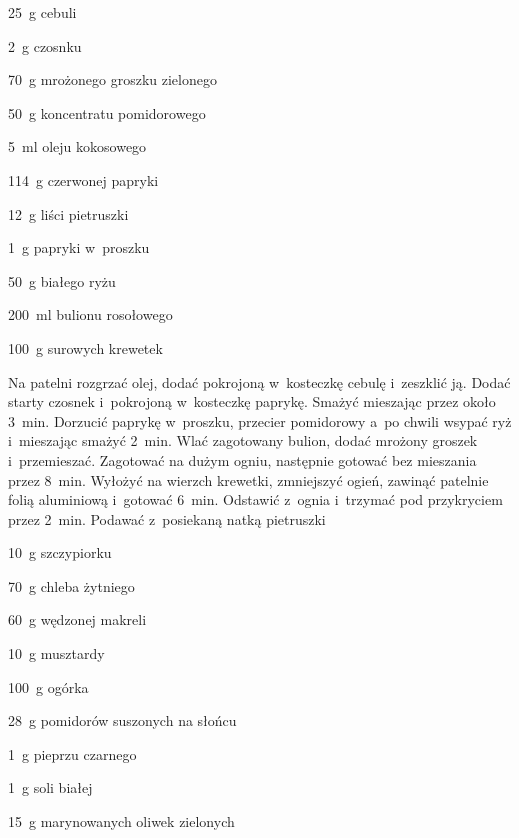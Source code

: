 \documentclass[../kucharek.tex]{subfiles}
\begin{document}
\begin{Ingred}
    \item \qty{25}{\gram} cebuli
    \item \qty{2}{\gram} czosnku
    \item \qty{70}{\gram} mrożonego groszku zielonego
    \item \qty{50}{\gram} koncentratu pomidorowego
    \item \qty{5}{\milli\litre} oleju kokosowego
    \item \qty{114}{\gram} czerwonej papryki
    \item \qty{12}{\gram} liści pietruszki
    \item \qty{1}{\gram} papryki w~proszku
    \item \qty{50}{\gram} białego ryżu
    \item \qty{200}{\milli\litre} bulionu rosołowego
    \item \qty{100}{\gram} surowych krewetek
\end{Ingred}

Na patelni rozgrzać olej, dodać pokrojoną w~kosteczkę cebulę i~zeszklić ją.
Dodać starty czosnek i~pokrojoną w~kosteczkę paprykę. Smażyć mieszając przez
około \qty{3}{\minute}. Dorzucić paprykę w~proszku, przecier pomidorowy a~po
chwili wsypać ryż i~mieszając smażyć \qty{2}{\minute}. Wlać zagotowany bulion,
dodać mrożony groszek i~przemieszać. Zagotować na dużym ogniu, następnie
gotować bez mieszania przez \qty{8}{\minute}. Wyłożyć na wierzch krewetki,
zmniejszyć ogień, zawinąć patelnie folią aluminiową i~gotować \qty{6}{\minute}.
Odstawić z~ognia i~trzymać pod przykryciem przez \qty{2}{\minute}. Podawać
z~posiekaną natką pietruszki


\begin{Ingred}
    \item \qty{10}{\gram} szczypiorku
    \item \qty{70}{\gram} chleba żytniego
    \item \qty{60}{\gram} wędzonej makreli
    \item \qty{10}{\gram} musztardy
    \item \qty{100}{\gram} ogórka
    \item \qty{28}{\gram} pomidorów suszonych na słońcu
    \item \qty{1}{\gram} pieprzu czarnego
    \item \qty{1}{\gram} soli białej
    \item \qty{15}{\gram} marynowanych oliwek zielonych
\end{Ingred}
\end{document}
